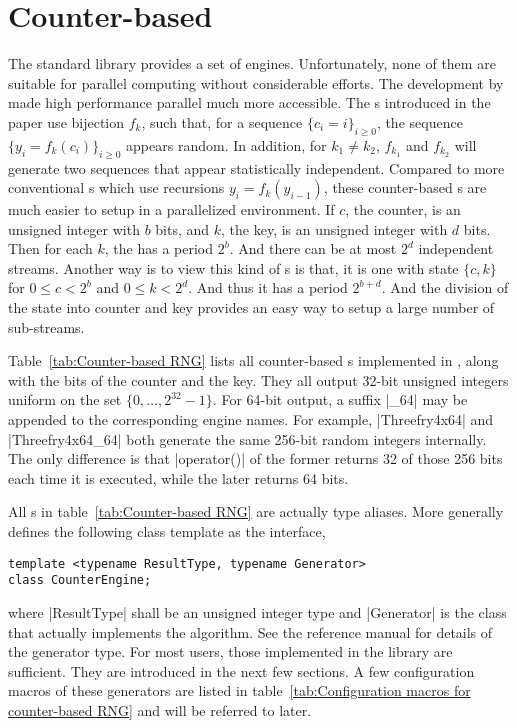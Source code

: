 \section{Counter-based \texorpdfstring{\protect\rng}{RNG}}
\label{sec:Counter-based RNG}

The standard library provides a set of \rng engines. Unfortunately, none of
them are suitable for parallel computing without considerable efforts. The
development by~\cite{Salmon:2011um} made high performance parallel \rng much
more accessible. The \rng{}s introduced in the paper use bijection $f_k$, such
that, for a sequence $\{c_i = i\}_{i\ge0}$, the sequence $\{y_i =
f_k(c_i)\}_{i\ge0}$ appears random. In addition, for $k_1 \ne k_2$, $f_{k_1}$
and $f_{k_2}$ will generate two sequences that appear statistically
independent. Compared to more conventional \rng{}s which use recursions $y_i =
f_k(y_{i - 1})$, these counter-based \rng{}s are much easier to setup in a
parallelized environment. If $c$, the counter, is an unsigned integer with $b$
bits, and $k$, the key, is an unsigned integer with $d$ bits. Then for each
$k$, the \rng has a period $2^b$. And there can be at most $2^d$ independent
streams. Another way is to view this kind of \rng{}s is that, it is one \rng{}
with state $\{c, k\}$ for $0 \le c < 2^b$ and $0 \le k < 2^d$. And thus it has
a period $2^{b + d}$. And the division of the state into counter and key
provides an easy way to setup a large number of sub-streams.

Table~\ref{tab:Counter-based RNG} lists all counter-based \rng{}s implemented
in \mckl, along with the bits of the counter and the key. They all output
32-bit unsigned integers uniform on the set $\{0,\dots,2^{32}-1\}$. For 64-bit
output, a suffix |_64| may be appended to the corresponding \rng engine names.
For example, |Threefry4x64| and |Threefry4x64_64| both generate the same
256-bit random integers internally. The only difference is that |operator()| of
the former returns 32 of those 256 bits each time it is executed, while the
later returns 64 bits.

All \rng{}s in table~\ref{tab:Counter-based RNG} are actually type aliases.
More generally \mckl defines the following class template as the interface,
\begin{Verbatim}
template <typename ResultType, typename Generator>
class CounterEngine;
\end{Verbatim}
where |ResultType| shall be an unsigned integer type and |Generator| is the
class that actually implements the algorithm. See the reference manual for
details of the generator type. For most users, those implemented in the library
are sufficient. They are introduced in the next few sections. A few
configuration macros of these generators are listed in
table~\ref{tab:Configuration macros for counter-based RNG} and will be referred
to later.

